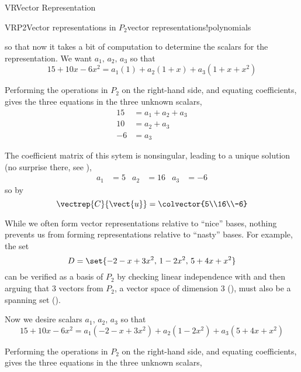 \begin{subsect}{VR}{Vector Representation}
\begin{example}{VRP2}{Vector representations in $P_2$}{vector representations!polynomials}
\begin{para}
%
so that now it takes a bit of computation to determine the scalars for the representation.  We want $a_1,\,a_2,\,a_3$ so that
%
\begin{equation*}
15+10x-6x^2=a_1(1)+a_2(1+x)+a_3(1+x+x^2)
\end{equation*}
\end{para}
%
\begin{para}Performing the operations in $P_2$ on the right-hand side, and equating coefficients, gives the three equations in the three unknown scalars,
%
\begin{align*}
15&=a_1+a_2+a_3\\
10&=a_2+a_3\\
-6&=a_3
\end{align*}
\end{para}
%
\begin{para}The coefficient matrix of this sytem is nonsingular, leading to a unique solution (no surprise there, see ),
%
\begin{align*}
a_1&=5&a_2&=16&a_3&=-6
\end{align*}
%
so by 
%
\begin{equation*}
\vectrep{C}{\vect{u}}=\colvector{5\\16\\-6}
\end{equation*}
\end{para}
%
\begin{para}While we often form vector representations relative to ``nice'' bases, nothing prevents us from forming representations relative to ``nasty'' bases.  For example, the set
%
\begin{equation*}
D=\set{
-2-x+3x^2,\,
1-2x^2,\,
5+4x+x^2
}
\end{equation*}
%
can be verified as a basis of $P_2$ by checking linear independence with  and then arguing that 3 vectors from $P_2$, a vector space of dimension 3 (), must also be a spanning set (). \end{para}
%
\begin{para}Now we desire scalars $a_1,\,a_2,\,a_3$ so that
%
\begin{equation*}
15+10x-6x^2=a_1(-2-x+3x^2)+a_2(1-2x^2)+a_3(5+4x+x^2)
\end{equation*}
\end{para}
%
\begin{para}Performing the operations in $P_2$ on the right-hand side, and equating coefficients, gives the three equations in the three unknown scalars,

\end{para}
\end{example}
\end{subsect}
